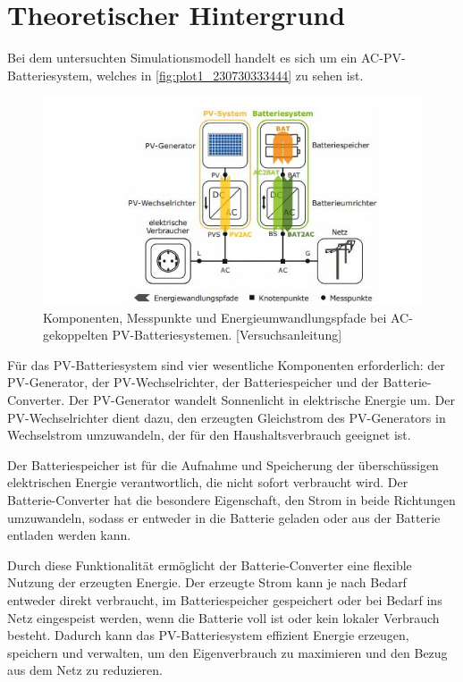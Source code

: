 \section{Theoretischer Hintergrund}
Bei dem untersuchten Simulationsmodell handelt es sich um ein AC-PV-Batteriesystem, welches in \autoref{fig:plot1_230730333444} zu sehen ist. 
\begin{figure}[H]
    \centering
    \includegraphics[width=\textwidth]{Abbildungen/12341234.jpg}
    \caption{Komponenten, Messpunkte und Energieumwandlungspfade bei AC-gekoppelten PV-Batteriesystemen.  [Versuchsanleitung]}
    \label{fig:plot1_230730333444}
\end{figure}
Für das PV-Batteriesystem sind vier wesentliche Komponenten erforderlich: der PV-Generator, der PV-Wechselrichter, der Batteriespeicher und der Batterie-Converter. Der PV-Generator wandelt Sonnenlicht in elektrische Energie um. Der PV-Wechselrichter dient dazu, den erzeugten Gleichstrom des PV-Generators in Wechselstrom umzuwandeln, der für den Haushaltsverbrauch geeignet ist.

Der Batteriespeicher ist für die Aufnahme und Speicherung der überschüssigen elektrischen Energie verantwortlich, die nicht sofort verbraucht wird. Der Batterie-Converter hat die besondere Eigenschaft, den Strom in beide Richtungen umzuwandeln, sodass er entweder in die Batterie geladen oder aus der Batterie entladen werden kann.

Durch diese Funktionalität ermöglicht der Batterie-Converter eine flexible Nutzung der erzeugten Energie. Der erzeugte Strom kann je nach Bedarf entweder direkt verbraucht, im Batteriespeicher gespeichert oder bei Bedarf ins Netz eingespeist werden, wenn die Batterie voll ist oder kein lokaler Verbrauch besteht. Dadurch kann das PV-Batteriesystem effizient Energie erzeugen, speichern und verwalten, um den Eigenverbrauch zu maximieren und den Bezug aus dem Netz zu reduzieren.


